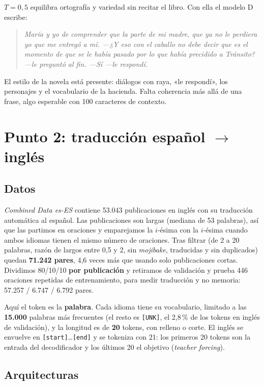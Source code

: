\documentclass[12pt,a4paper]{article}
\begin{document}
$T=0{,}5$ equilibra ortografía y variedad sin recitar el libro. Con ella el modelo D escribe:

\begin{quote}\small\itshape
María y yo de comprender que la parte de mi madre, que ya no le perdiera yo que me entregó a mí.
---¿Y eso con el caballo no debe decir que es el momento de que se le había pasado por lo que había
precidido a Tránsito? ---le preguntó al fin. ---Sí ---le respondí.
\end{quote}

El estilo de la novela está presente: diálogos con raya, «le respondí», los personajes y el vocabulario
de la hacienda. Falta coherencia más allá de una frase, algo esperable con 100 caracteres de contexto.

\section{Punto 2: traducción español $\rightarrow$ inglés}

\subsection{Datos}

\emph{Combined Data es-ES} contiene 53.043 publicaciones en inglés con su traducción automática al español.
Las publicaciones son largas (mediana de 53 palabras), así que las partimos en oraciones y emparejamos la
$i$-ésima con la $i$-ésima cuando ambos idiomas tienen el mismo número de oraciones. Tras filtrar (de 2 a 20
palabras, razón de largos entre 0,5 y 2, sin \emph{mojibake}, traducidas y sin duplicados) quedan
\textbf{71.242 pares}, 4,6 veces más que usando solo publicaciones cortas. Dividimos 80/10/10
\textbf{por publicación} y retiramos de validación y prueba 446 oraciones repetidas de entrenamiento, para
medir traducción y no memoria: 57.257 / 6.747 / 6.792 pares.

Aquí el token es la \textbf{palabra}. Cada idioma tiene su vocabulario, limitado a las \textbf{15.000}
palabras más frecuentes (el resto es \texttt{[UNK]}, el 2,8\,\% de los tokens en inglés de validación), y la
longitud es de \textbf{20} tokens, con relleno o corte. El inglés se envuelve en \texttt{[start]}\ldots\texttt{[end]}
y se tokeniza con 21: los primeros 20 tokens son la entrada del decodificador y los últimos 20 el objetivo
(\emph{teacher forcing}).

\subsection{Arquitecturas}
\end{document}
